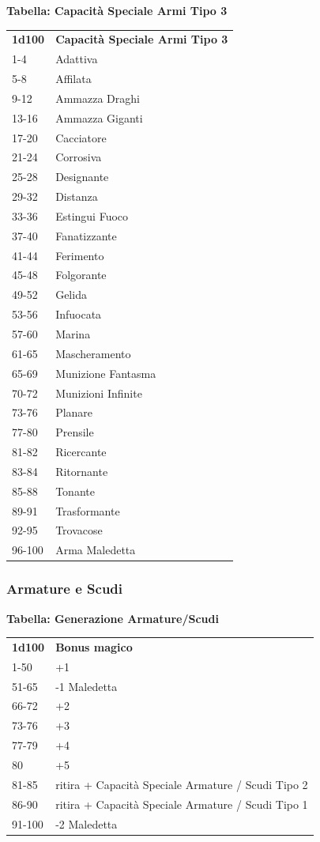 \begin{multicols}{2}
\textbf{Tabella: Capacità Speciale Armi Tipo 3}

\medskip

\begin{tabular}{ll}
\textbf{1d100} & \textbf{Capacità Speciale Armi Tipo 3}\\
1-4& Adattiva\\
5-8 &Affilata\\
9-12& Ammazza Draghi\\
13-16& Ammazza Giganti\\
17-20 &Cacciatore\\
21-24 &Corrosiva\\
25-28& Designante\\
29-32& Distanza\\
33-36& Estingui Fuoco\\
37-40 &Fanatizzante\\
41-44 &Ferimento\\
45-48 &Folgorante\\
49-52 &Gelida\\
53-56 &Infuocata\\
57-60 &Marina\\
61-65 &Mascheramento\\
65-69 &Munizione Fantasma\\
70-72 &Munizioni Infinite\\
73-76 &Planare\\
77-80 &Prensile\\
81-82 &Ricercante\\
83-84 &Ritornante\\
85-88 &Tonante\\
89-91 &Trasformante\\
92-95& Trovacose\\
96-100 & Arma Maledetta\\
\end{tabular}

\medskip

\subsubsection{Armature e Scudi}

\textbf{Tabella: Generazione Armature/Scudi}

\medskip

\begin{tabularx}{0.45\textwidth}{lX}
\textbf{1d100} & \textbf{Bonus magico}\\
1-50 &  +1\\
51-65 & -1 Maledetta\\
66-72 & +2\\
73-76 & +3\\
77-79 & +4\\
80 &    +5\\
81-85 & ritira + Capacità Speciale Armature / Scudi Tipo 2\\
86-90 & ritira + Capacità Speciale Armature / Scudi Tipo 1\\
91-100 &-2 Maledetta\\
\end{tabularx}


\end{multicols}
